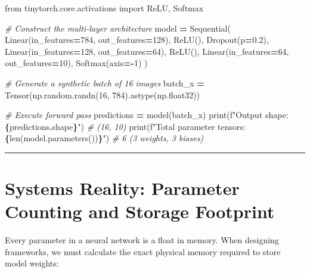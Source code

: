 \documentclass[
  letterpaper,
]{scrbook}
\newenvironment{Shaded}{\begin{snugshade}}{\end{snugshade}}
\newcommand{\BuiltInTok}[1]{#1}
\newcommand{\CommentTok}[1]{\textcolor[rgb]{0.56,0.35,0.01}{\textit{#1}}}
\newcommand{\DecValTok}[1]{\textcolor[rgb]{0.00,0.00,0.81}{#1}}
\newcommand{\FloatTok}[1]{\textcolor[rgb]{0.00,0.00,0.81}{#1}}
\newcommand{\ImportTok}[1]{#1}
\newcommand{\NormalTok}[1]{#1}
\newcommand{\OperatorTok}[1]{\textcolor[rgb]{0.81,0.36,0.00}{\textbf{#1}}}
\newcommand{\SpecialCharTok}[1]{\textcolor[rgb]{0.81,0.36,0.00}{\textbf{#1}}}
\newcommand{\SpecialStringTok}[1]{\textcolor[rgb]{0.31,0.60,0.02}{#1}}
\begin{document}
\begin{Shaded}
\begin{Highlighting}[]
\ImportTok{from}\NormalTok{ tinytorch.core.activations }\ImportTok{import}\NormalTok{ ReLU, Softmax}

\CommentTok{\# Construct the multi{-}layer architecture}
\NormalTok{model }\OperatorTok{=}\NormalTok{ Sequential(}
\NormalTok{    Linear(in\_features}\OperatorTok{=}\DecValTok{784}\NormalTok{, out\_features}\OperatorTok{=}\DecValTok{128}\NormalTok{),}
\NormalTok{    ReLU(),}
\NormalTok{    Dropout(p}\OperatorTok{=}\FloatTok{0.2}\NormalTok{),}
\NormalTok{    Linear(in\_features}\OperatorTok{=}\DecValTok{128}\NormalTok{, out\_features}\OperatorTok{=}\DecValTok{64}\NormalTok{),}
\NormalTok{    ReLU(),}
\NormalTok{    Linear(in\_features}\OperatorTok{=}\DecValTok{64}\NormalTok{, out\_features}\OperatorTok{=}\DecValTok{10}\NormalTok{),}
\NormalTok{    Softmax(axis}\OperatorTok{={-}}\DecValTok{1}\NormalTok{)}
\NormalTok{)}

\CommentTok{\# Generate a synthetic batch of 16 images}
\NormalTok{batch\_x }\OperatorTok{=}\NormalTok{ Tensor(np.random.randn(}\DecValTok{16}\NormalTok{, }\DecValTok{784}\NormalTok{).astype(np.float32))}

\CommentTok{\# Execute forward pass}
\NormalTok{predictions }\OperatorTok{=}\NormalTok{ model(batch\_x)}
\BuiltInTok{print}\NormalTok{(}\SpecialStringTok{f"Output shape: }\SpecialCharTok{\{}\NormalTok{predictions}\SpecialCharTok{.}\NormalTok{shape}\SpecialCharTok{\}}\SpecialStringTok{"}\NormalTok{)  }\CommentTok{\# (16, 10)}
\BuiltInTok{print}\NormalTok{(}\SpecialStringTok{f"Total parameter tensors: }\SpecialCharTok{\{}\BuiltInTok{len}\NormalTok{(model.parameters())}\SpecialCharTok{\}}\SpecialStringTok{"}\NormalTok{)  }\CommentTok{\# 6 (3 weights, 3 biases)}
\end{Highlighting}
\end{Shaded}

\begin{center}\rule{0.5\linewidth}{0.5pt}\end{center}

\section{Systems Reality: Parameter Counting and Storage
Footprint}\label{systems-reality-parameter-counting-and-storage-footprint}

Every parameter in a neural network is a float in memory. When designing
frameworks, we must calculate the exact physical memory required to
store model weights:
\end{document}
